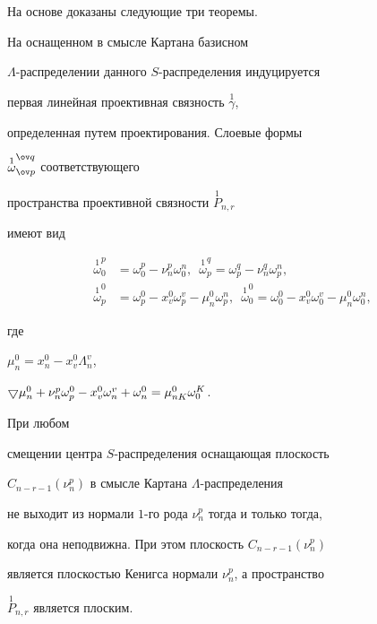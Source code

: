 На основе \cite{rab15} доказаны следующие три теоремы.





\begin{thm}


На оснащенном в смысле Картана базисном


$\Lambda$-распределении данного $S$-рас\-пре\-де\-ле\-ния индуцируется


первая линейная проективная связность $\overset{1}{\gamma}$,


определенная путем проектирования. Слоевые формы


$\overset{1}{\omega}^{\ov q}_{\ov p}$ соответствующего


пространства проективной связности $\stackrel{1}{P}_{n,r}$


имеют вид


\begin{align*}


\overset{1}{\omega}^p_0&=\omega^p_0-\nu^p_n \omega^n_0,\ \;


\overset{1}{\omega}^q_p=\omega^q_p-\nu^q_n \omega^n_p, \\


\overset{1}{\omega}^0_p&=\omega^0_p-x^0_v \omega^v_p-\mu^0_n \omega^n_p,\ \;


\overset{1}{\omega}^0_0=\omega^0_0-x^0_v \omega^v_0-\mu^0_n \omega^n_0,


\end{align*}


где


$\mu^0_n=x^0_n-x^0_v \Lambda^v_n$,


$\bgd \mu^0_n+\nu^p_n \omega^0_p-x^0_v \omega^v_n+


\omega^0_n=\mu^0_{nK} \omega^K_0$.


При любом


смещении центра $S$-распределения оснащающая плоскость


$C_{n-r-1}(\nu^p_n)$ в смысле Картана $\Lambda$-распределения


не выходит из нормали $1$-го рода $\nu^p_n$ тогда и только тогда,


когда она неподвижна. При этом плоскость $C_{n-r-1}(\nu^p_n)$


является плоскостью Кенигса нормали $\nu^p_n$, а пространство


$\overset{1}{P}_{n,r}$ является плоским.


\end{thm}





